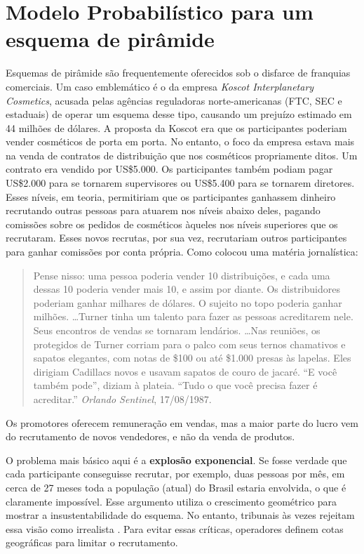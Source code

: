 \documentclass[a4paper,12pt]{article}
\begin{document}
\section*{Modelo Probabilístico para um esquema de pirâmide }


Esquemas de pirâmide são frequentemente oferecidos sob o disfarce de
franquias comerciais. Um caso emblemático é o da empresa \emph{Koscot
  Interplanetary Cosmetics}, acusada pelas agências reguladoras
norte-americanas (FTC, SEC e estaduais) de operar um esquema desse
tipo, causando um prejuízo estimado em 44 milhões de dólares.  A
proposta da Koscot era que os participantes poderiam vender cosméticos
de porta em porta. No entanto, o foco da empresa estava mais na venda
de contratos de distribuição que nos cosméticos propriamente ditos. Um
contrato era vendido por US\$5.000. Os participantes também podiam
pagar US\$2.000 para se tornarem supervisores ou US\$5.400 para se
tornarem diretores. Esses níveis, em teoria, permitiriam que os
participantes ganhassem dinheiro recrutando outras pessoas para atuarem
nos níveis abaixo deles, pagando comissões sobre os pedidos de
cosméticos àqueles nos níveis superiores que os recrutaram. Esses novos
recrutas, por sua vez, recrutariam outros participantes para ganhar
comissões por conta própria. Como colocou uma matéria jornalística:
\begin{quotation}
  Pense nisso: uma pessoa poderia vender 10 distribuições, e cada uma
  dessas 10 poderia vender mais 10, e assim por diante. Os
  distribuidores poderiam ganhar milhares de dólares. O sujeito no topo
  poderia ganhar milhões. \dots Turner tinha um talento para fazer as
  pessoas acreditarem nele. Seus encontros de vendas se tornaram
  lendários. \dots Nas reuniões, os protegidos de Turner corriam para o
  palco com seus ternos chamativos e sapatos elegantes, com notas de
  \$100 ou até \$1.000 presas às lapelas. Eles dirigiam Cadillacs novos
  e usavam sapatos de couro de jacaré. ``E você também pode'', diziam à
  plateia. ``Tudo o que você precisa fazer é acreditar.'' \emph{Orlando
    Sentinel}, 17/08/1987.
\end{quotation}

Os promotores oferecem remuneração em vendas, mas a maior parte do
lucro vem do recrutamento de novos vendedores, e não da venda de
produtos.

O problema mais básico aqui é a \textbf{explosão exponencial}. Se fosse
verdade que cada participante conseguisse recrutar, por exemplo, duas
pessoas por mês, em cerca de 27 meses toda a população (atual) do
Brasil estaria envolvida, o que é claramente impossível. Esse argumento
utiliza o crescimento geométrico para mostrar a insustentabilidade do
esquema. No entanto, tribunais às vezes rejeitam essa visão como
irrealista \cite{gerro_mar}. Para evitar essas críticas, operadores
definem cotas geográficas para limitar o recrutamento.
\end{document}
